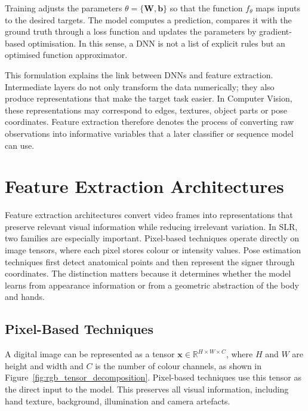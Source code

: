 Training adjusts the parameters $\theta=\{\mathbf{W},\mathbf{b}\}$ so that the function
$f_{\theta}$ maps inputs to the desired targets. The model computes a prediction, compares it with
the ground truth through a loss function and updates the parameters by gradient-based optimisation.
In this sense, a DNN is not a list of explicit rules but an optimised function approximator.

This formulation explains the link between DNNs and feature extraction. Intermediate layers do not
only transform the data numerically; they also produce representations that make the target task
easier. In Computer Vision, these representations may correspond to edges, textures, object parts
or pose coordinates. Feature extraction therefore denotes the process of converting raw
observations into informative variables that a later classifier or sequence model can use.

\section{Feature Extraction Architectures}
\label{sec:feature_extraction_architectures}

Feature extraction architectures convert video frames into representations that preserve relevant
visual information while reducing irrelevant variation. In SLR, two families are especially
important. Pixel-based techniques operate directly on image tensors, where each pixel stores colour
or intensity values. Pose estimation techniques first detect anatomical points and then represent
the signer through coordinates. The distinction matters because it determines whether the model
learns from appearance information or from a geometric abstraction of the body and hands.

\subsection{Pixel-Based Techniques}

A digital image can be represented as a tensor $\mathbf{x}\in\mathbb{R}^{H\times W\times C}$, where
$H$ and $W$ are height and width and $C$ is the number of colour channels, as shown in
Figure~\ref{fig:rgb_tensor_decomposition}. Pixel-based techniques use this tensor as the direct
input to the model. This preserves all visual information, including hand texture, background,
illumination and camera artefacts.

